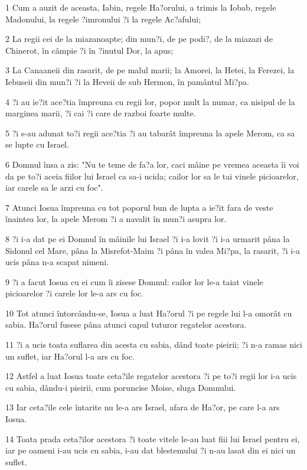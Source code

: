 \par 1 Cum a auzit de aceasta, Iabin, regele Ha?orului, a trimis la Iobab, regele Madonului, la regele ?imronului ?i la regele Ac?afului;
\par 2 La regii cei de la miazanoapte; din mun?i, de pe podi?, de la miazazi de Chinerot, în câmpie ?i în ?inutul Dor, la apus;
\par 3 La Canaaneii din rasarit, de pe malul marii; la Amorei, la Hetei, la Ferezei, la Iebuseii din mun?i ?i la Heveii de sub Hermon, în pamântul Mi?pa.
\par 4 ?i au ie?it ace?tia împreuna cu regii lor, popor mult la numar, ca nisipul de la marginea marii, ?i cai ?i care de razboi foarte multe.
\par 5 ?i s-au adunat to?i regii ace?tia ?i au tabarât împreuna la apele Merom, ca sa se lupte cu Israel.
\par 6 Domnul însa a zis: "Nu te teme de fa?a lor, caci mâine pe vremea aceasta îi voi da pe to?i aceia fiilor lui Israel ca sa-i ucida; cailor lor sa le tai vinele picioarelor, iar carele sa le arzi cu foc".
\par 7 Atunci Iosua împreuna cu tot poporul bun de lupta a ie?it fara de veste înaintea lor, la apele Merom ?i a navalit în mun?i asupra lor.
\par 8 ?i i-a dat pe ei Domnul în mâinile lui Israel ?i i-a lovit ?i i-a urmarit pâna la Sidonul cel Mare, pâna la Misrefot-Maim ?i pâna în valea Mi?pa, la rasarit, ?i i-a ucis pâna n-a scapat nimeni.
\par 9 ?i a facut Iosua cu ei cum îi zisese Domnul: cailor lor le-a taiat vinele picioarelor ?i carele lor le-a ars cu foc.
\par 10 Tot atunci întorcându-se, Iosua a luat Ha?orul ?i pe regele lui l-a omorât cu sabia. Ha?orul fusese pâna atunci capul tuturor regatelor acestora.
\par 11 ?i a ucis toata suflarea din acesta cu sabia, dând toate pieirii; ?i n-a ramas nici un suflet, iar Ha?orul l-a ars cu foc.
\par 12 Astfel a luat Iosua toate ceta?ile regatelor acestora ?i pe to?i regii lor i-a ucis cu sabia, dându-i pieirii, cum poruncise Moise, sluga Domnului.
\par 13 Iar ceta?ile cele întarite nu le-a ars Israel, afara de Ha?or, pe care l-a ars Iosua.
\par 14 Toata prada ceta?ilor acestora ?i toate vitele le-au luat fiii lui Israel pentru ei, iar pe oameni i-au ucis cu sabia, i-au dat blestemului ?i n-au lasat din ei nici un suflet.
